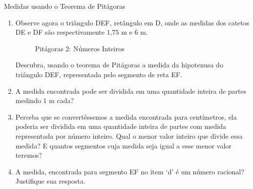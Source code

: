 \begin{task}{Medidas usando o Teorema de Pitágoras}
\begin{enumerate}
\item {} 
Observe agora o triângulo DEF, retângulo em D, onde as medidas dos catetos DE e DF são respectivamente $1\text{,}75$ m e $6$ m.

\begin{figure}[H]
\centering
\capstart

\caption{Pitágoras 2: Números Inteiros}\label{\detokenize{NO103-5:id7}}\label{\detokenize{NO103-5:id17}}\end{figure}

Descubra, usando o teorema de Pitágoras a medida da hipotenusa do triângulo DEF, representada pelo segmento de reta EF.

\item {} 
A medida encontrada pode ser dividida em uma quantidade inteira de partes medindo $1$ m cada?

\item {} 
Perceba que se convertêssemos a medida encontrada para centímetros, ela poderia ser dividida em uma quantidade inteira de partes com medida representada por número inteiro. Qual o menor valor inteiro que divide essa medida? E quantos segmentos cuja medida seja igual a esse menor valor teremos?

\item {} 
A medida, encontrada para segmento EF no item  ‘d’  é um número racional? Justifique sua resposta.

\end{enumerate}
\end{task}


